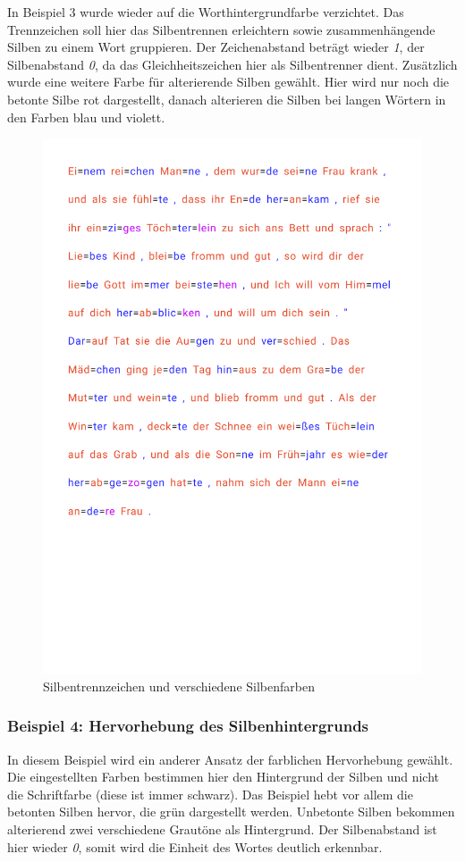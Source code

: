 In Beispiel 3 wurde wieder auf die Worthintergrundfarbe verzichtet. Das Trennzeichen \qq{=} soll hier das Silbentrennen erleichtern sowie zusammenhängende Silben zu einem Wort gruppieren. Der Zeichenabstand beträgt wieder \textit{1}, der Silbenabstand \textit{0}, da das Gleichheitszeichen hier als Silbentrenner dient. Zusätzlich wurde eine weitere Farbe für alterierende Silben gewählt. Hier wird nur noch die betonte Silbe rot dargestellt, danach alterieren die Silben bei langen Wörtern in den Farben blau und violett.

\begin{figure}[h!]
	\centering
	\includegraphics[width=.7\linewidth, frame]{figures/evaluation/annotation3}
	\caption{Silbentrennzeichen und verschiedene Silbenfarben}
	\label{fig:evaluation-ex3}
\end{figure}
\newpage

\subsubsection{Beispiel 4: Hervorhebung des Silbenhintergrunds}

In diesem Beispiel wird ein anderer Ansatz der farblichen Hervorhebung gewählt. Die eingestellten Farben bestimmen hier den Hintergrund der Silben und nicht die Schriftfarbe (diese ist immer schwarz). Das Beispiel hebt vor allem die betonten Silben hervor, die grün dargestellt werden. Unbetonte Silben bekommen alterierend zwei verschiedene Grautöne als Hintergrund. Der Silbenabstand ist hier wieder \textit{0}, somit wird die Einheit des Wortes deutlich erkennbar.

